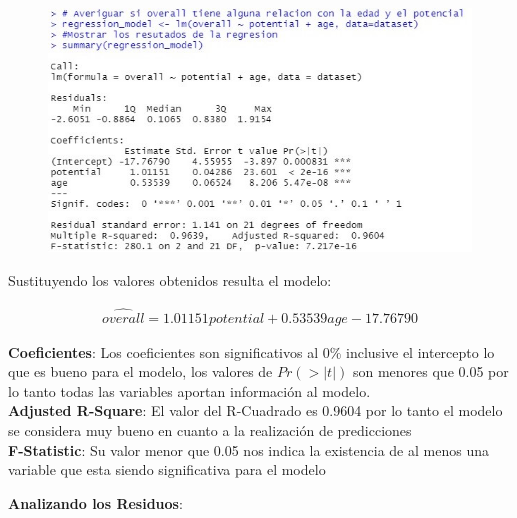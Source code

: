 \documentclass[a4paper,10pt,twocolumn]{article}
\begin{document}
\begin{figure}[h]
	\includegraphics[scale=0.65]{./imgs/reg_model.jpg}
\end{figure}

Sustituyendo los valores obtenidos resulta el modelo:

\begin{align*}
\widehat{overall} = 1.01151 potential + 0.53539 age - 17.76790
\end{align*}

\textbf{Coeficientes}: Los coeficientes son significativos al $0\%$ inclusive el intercepto lo que es bueno para el modelo, los valores de $Pr(>|t|)$ son menores que 0.05 por lo tanto todas las variables aportan información al modelo.\\

\textbf{Adjusted R-Square}: El valor del R-Cuadrado es 0.9604 por lo tanto el modelo se considera muy bueno en cuanto a la realizaci\'on de predicciones\\

\textbf{F-Statistic}: Su valor menor que 0.05 nos indica la existencia de al menos una variable que esta siendo significativa para el modelo\\

\newpage

\textbf{Analizando los Residuos}:
\end{document}

